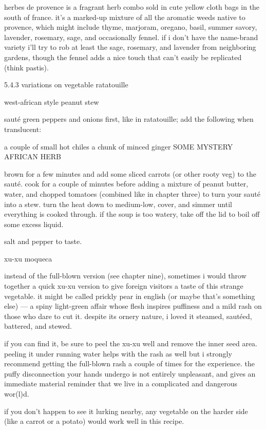 herbes de provence is a fragrant herb combo sold in cute yellow cloth bags in the south of france. it's a marked-up mixture of all the aromatic weeds native to provence, which might include thyme, marjoram, oregano, basil, summer savory, lavender, rosemary, sage, and occasionally fennel. if i don't have the name-brand variety i'll try to rob at least the sage, rosemary, and lavender from neighboring gardens, though the fennel adds a nice touch that can't easily be replicated (think pastis).


5.4.3 variations on vegetable ratatouille

west-african style peanut stew

saut\'{e} green peppers and onions first, like in ratatouille; add the following when translucent:

	a couple of small hot chiles
	a chunk of minced ginger
	SOME MYSTERY AFRICAN HERB
	
brown for a few minutes and add some sliced carrots (or other rooty veg) to the saut\'{e}. cook for a couple of minutes before adding a mixture of peanut butter, water, and chopped tomatoes (combined like in chapter three) to turn your saut\'{e} into a stew. turn the heat down to medium-low, cover, and simmer until everything is cooked through. if the soup is too watery, take off the lid to boil off some excess liquid.

salt and pepper to taste.

xu-xu moqueca

instead of the full-blown version (see chapter nine), sometimes i would throw together a quick xu-xu version to give foreign visitors a taste of this strange vegetable. it might be called prickly pear in english (or maybe that's something else) --- a spiny light-green affair whose flesh inspires puffiness and a mild rash on those who dare to cut it. despite its ornery nature, i loved it steamed, saut\'{e}ed, battered, and stewed.

if you can find it, be sure to peel the xu-xu well and remove the inner seed area. peeling it under running water helps with the rash as well but i strongly recommend getting the full-blown rash a couple of times for the experience. the puffy disconnection your hands undergo is not entirely unpleasant, and gives an immediate material reminder that we live in a complicated and dangerous wor(l)d.

if you don't happen to see it lurking nearby, any vegetable on the harder side (like a carrot or a potato) would work well in this recipe.

